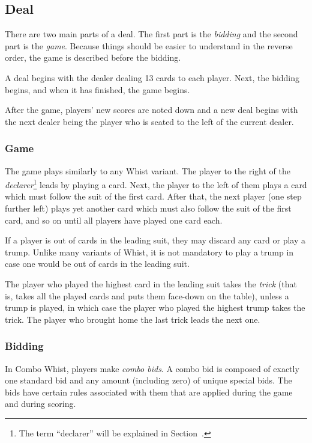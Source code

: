 \documentclass[a4paper]{article}
\begin{document}
		\subsection{Deal}
			There are two main parts of a deal. The first part is the \emph{bidding} and the second part is the \emph{game}. Because things should be easier to understand in the reverse order, the game is described before the bidding.

			A deal begins with the dealer dealing 13 cards to each player. Next, the bidding begins, and when it has finished, the game begins.

			After the game, players' new scores are noted down and a new deal begins with the next dealer being the player who is seated to the left of the current dealer.

			\subsubsection{Game}
				The game plays similarly to any Whist variant. The player to the right of the \emph{declarer}\footnote{The term ``declarer'' will be explained in Section~.} leads by playing a card. Next, the player to the left of them plays a card which must follow the suit of the first card. After that, the next player (one step further left) plays yet another card which must also follow the suit of the first card, and so on until all players have played one card each.

				If a player is out of cards in the leading suit, they may discard any card or play a trump. Unlike many variants of Whist, it is not mandatory to play a trump in case one would be out of cards in the leading suit.

				The player who played the highest card in the leading suit takes the \emph{trick} (that is, takes all the played cards and puts them face-down on the table), unless a trump is played, in which case the player who played the highest trump takes the trick. The player who brought home the last trick leads the next one.

			\subsubsection{Bidding}
				\label{sec:bidding}
				In Combo Whist, players make \emph{combo bids}. A combo bid is composed of exactly one standard bid and any amount (including zero) of unique special bids. The bids have certain rules associated with them that are applied during the game and during scoring.
\end{document}
